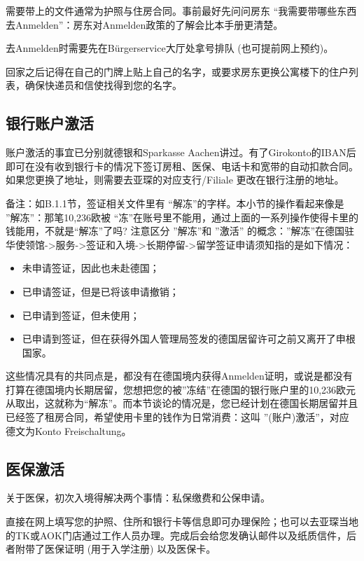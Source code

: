     需要带上的文件通常为护照与住房合同。事前最好先问问房东 “我需要带哪些东西去Anmelden”：房东对Anmelden政策的了解会比本手册更清楚。

    去Anmelden时需要先在Bürgerservice大厅处拿号排队 (也可提前网上预约)。

    回家之后记得在自己的门牌上贴上自己的名字，或要求房东更换公寓楼下的住户列表，确保快递员和信使找得到您的名字。

  \subsection{银行账户激活}

    账户激活的事宜已分别就德银和Sparkasse Aachen讲过。有了Girokonto的IBAN后即可在没有收到银行卡的情况下签订房租、医保、电话卡和宽带的自动扣款合同。如果您更换了地址，则需要去亚琛的对应支行/Filiale 更改在银行注册的地址。

    备注：如B.1.1节，签证相关文件里有 “解冻”的字样。本小节的操作看起来像是 ”解冻”：那笔10,236欧被 “冻”在账号里不能用，通过上面的一系列操作使得卡里的钱能用，不就是“解冻”了吗? 注意区分 ”解冻”和 ”激活” 的概念：”解冻”在德国驻华使领馆->服务->签证和入境->长期停留->留学签证申请须知指的是如下情况：
    \begin{itemize}
      \item 未申请签证，因此也未赴德国；
      \item 已申请签证，但是已将该申请撤销；
      \item 已申请到签证，但未使用；
      \item 已申请到签证，但在获得外国人管理局签发的德国居留许可之前又离开了申根国家。
    \end{itemize}

    这些情况具有的共同点是，都没有在德国境内获得Anmelden证明，或说是都没有打算在德国境内长期居留，您想把您的被”冻结”在德国的银行账户里的10,236欧元从取出，这就称为“解冻”。而本节谈论的情况是，您已经计划在德国长期居留并且已经签了租房合同，希望使用卡里的钱作为日常消费：这叫 ”(账户)激活”，对应德文为Konto Freischaltung。

  \subsection{医保激活}

    关于医保，初次入境得解决两个事情：私保缴费和公保申请。

    直接在网上填写您的护照、住所和银行卡等信息即可办理保险；也可以去亚琛当地的TK或AOK门店通过工作人员办理。完成后会给您发确认邮件以及纸质信件，后者附带了医保证明 (用于入学注册) 以及医保卡。

